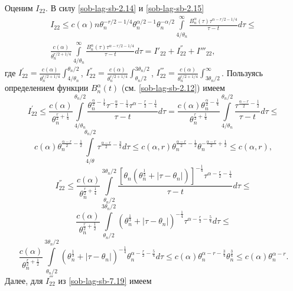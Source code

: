 Оценим $I_{22}$. В силу \eqref{sob-lag-sb-2.14} и \eqref{sob-lag-sb-2.15}
\begin{multline}
  I_{22} \le
  c(\alpha)n\theta_n^{-r/2-1/4}\theta_n^{\alpha/2-1}\theta_n^{-\alpha/2}
  \int\limits_{4/\theta_n}^{\infty}\frac{B_n^\alpha(\tau)\tau^{\alpha-r/2-1/4}}{\tau - t}d\tau \le\\
  \frac{c(\alpha)}{\theta_n^{r/2+1/4}}\int\limits_{4/\theta_n}^{\infty}\frac{B_n^\alpha(\tau)\tau^{\alpha - r/2 - 1/4}}{\tau - t}d\tau =
  I{'}_{22}+I^{''}_{22}+I{'''}_{22},
  \label{sob-lag-sb-7.16}
\end{multline}
где
$
  I^{'}_{22} = \frac{c(\alpha)}{\theta_n^{r/2+1/4}}\int_{4/\theta_n}^{\theta_n/2}
$,
$
  I^{''}_{22} = \frac{c(\alpha)}{\theta_n^{r/2+1/4}}\int_{\theta_n/2}^{3\theta_n/2}
$,
$
I_{22}^{'''}=\frac {c(\alpha)}{\theta_n^{ r/2 + 1/4 }}\int_{3\theta_n/2}^\infty
$.
Пользуясь определением функции $B_n^\alpha(t)$ (см. \eqref{sob-lag-sb-2.12}) имеем
$$
I_{22}^{'}\le\frac {c(\alpha)}{\theta_n^{\frac r 2+ \frac 1 4}}\int\limits_{4/\theta_n}^{\theta_n/2}\frac{\theta_n^{\frac \alpha 2-\frac 1 4}\tau^{-\frac \alpha 2- \frac 1 4}\tau^{\alpha-\frac r 2 -\frac 1 4}}{\tau-t}d\tau=
\frac {c(\alpha)\theta_n^{\frac \alpha 2 -\frac 1 4}} {\theta _n^{\frac r 2+\frac 1 4}}\int\limits_{4/\theta_n}^{\theta_n/2}\frac{\tau^{\frac{\alpha-r}{2} - \frac 1 2}}{\tau-t}d\tau\le
$$
\begin{equation}\label {7.17}
c(\alpha)\theta_n^{\frac {\alpha-r} 2-\frac 1 2}\int\limits_{4/\theta}^{\theta_n/2}\tau^{\frac {\alpha-r} 2 - \frac 3 2}d\tau\le
c(\alpha,r)\theta_n^{\frac {\alpha-r} 2-\frac 1 2 }\theta_n^{-\frac {\alpha-r}2+\frac 1 2 }\le c(\alpha,r),
\end{equation}
$$
I_{22}^{''}\le \frac {c(\alpha)}{\theta_n^{\frac r2+\frac 1 4}}\int\limits_{\theta_n/2}^{3\theta_n/2}\frac {[\theta_n(\theta_n^{\frac 1 3}+|\tau-\theta_n|)]^{-\frac 1 4 }\tau^{\alpha-\frac r 2 - \frac 1 4}}{\tau-t}d\tau\le
$$
$$
\frac {c(\alpha)}{\theta_n^{\frac r 2 +\frac 1 2}}\int\limits_{\theta_n/2}^{3\theta_n/2}(\theta_n^{\frac 1 3}+|\tau-\theta_n|)^{-\frac14}\tau^{\alpha-\frac r 2 -\frac 5 4}d\tau\le
$$
\begin{equation}\label{sob-lag-sb-7.18}
\frac {c(\alpha)}{\theta_n^{\frac r 2 +\frac 1 2}}\int\limits_{\theta_n/2}^{3\theta_n/2}(\theta_n^{\frac 1 3}+|\tau-\theta_n|)^{-\frac14}\theta_n^{\alpha-\frac r 2 -\frac 5 4}d\tau\le
c(\alpha)\theta_n^{\alpha-r- \frac 3 4}\theta_n^{\frac 3 4}\le c(\alpha)\theta_n^{\alpha-r}.
\end{equation}
Далее, для $I_{22}^{'''}$ из \eqref{sob-lag-sb-7.19} имеем
